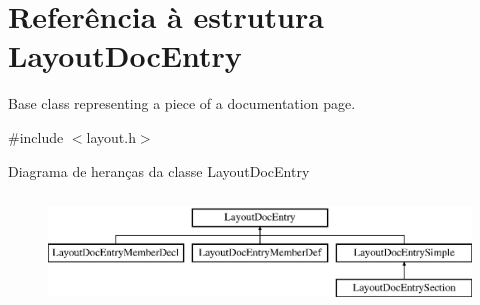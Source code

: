 \hypertarget{struct_layout_doc_entry}{\section{Referência à estrutura Layout\-Doc\-Entry}
\label{struct_layout_doc_entry}
}


Base class representing a piece of a documentation page.  




{\ttfamily \#include $<$layout.\-h$>$}

Diagrama de heranças da classe Layout\-Doc\-Entry\begin{figure}[H]
\begin{center}
\leavevmode
\includegraphics[height=3.000000cm]{struct_layout_doc_entry}
\end{center}
\end{figure}
